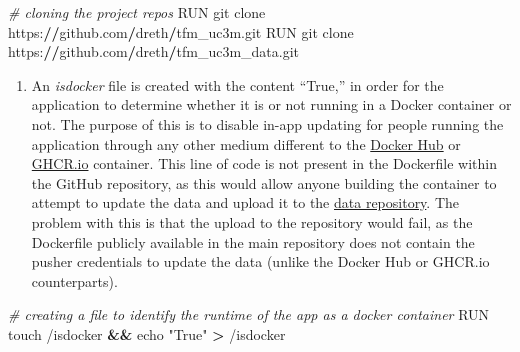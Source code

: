 \documentclass[
  a4paper]{article}
\newenvironment{Shaded}{\begin{snugshade}}{\end{snugshade}}
\newcommand{\CommentTok}[1]{\textcolor[rgb]{0.56,0.35,0.01}{\textit{#1}}}
\newcommand{\NormalTok}[1]{#1}
\newcommand{\OperatorTok}[1]{\textcolor[rgb]{0.81,0.36,0.00}{\textbf{#1}}}
\newcommand{\StringTok}[1]{\textcolor[rgb]{0.31,0.60,0.02}{#1}}
\providecommand{\tightlist}{%
  \setlength{\itemsep}{0pt}\setlength{\parskip}{0pt}}
\begin{document}
\footnotesize

\begin{Shaded}
\begin{Highlighting}[]
\CommentTok{\# cloning the project repos}
\NormalTok{RUN git clone https:}\OperatorTok{//}\NormalTok{github.com}\OperatorTok{/}\NormalTok{dreth}\OperatorTok{/}\NormalTok{tfm\_uc3m.git}
\NormalTok{RUN git clone https:}\OperatorTok{//}\NormalTok{github.com}\OperatorTok{/}\NormalTok{dreth}\OperatorTok{/}\NormalTok{tfm\_uc3m\_data.git}
\end{Highlighting}
\end{Shaded}

\normalsize

\begin{enumerate}
\def\labelenumi{\arabic{enumi}.}
\setcounter{enumi}{4}
\tightlist
\item
  An \emph{isdocker} file is created with the content ``True,'' in order
  for the application to determine whether it is or not running in a
  Docker container or not. The purpose of this is to disable in-app
  updating for people running the application through any other medium
  different to the \href{https://hub.docker.com/r/dreth/tfm_uc3m}{Docker
  Hub} or
  \href{https://github.com/dreth/tfm_uc3m/pkgs/container/tfm_uc3m}{GHCR.io}
  container. This line of code is not present in the Dockerfile within
  the GitHub repository, as this would allow anyone building the
  container to attempt to update the data and upload it to the
  \href{https://github.com/dreth/tfm_uc3m_data}{data repository}. The
  problem with this is that the upload to the repository would fail, as
  the Dockerfile publicly available in the main repository does not
  contain the pusher credentials to update the data (unlike the Docker
  Hub or GHCR.io counterparts).
\end{enumerate}

\footnotesize

\begin{Shaded}
\begin{Highlighting}[]
\CommentTok{\# creating a file to identify the runtime of the app as a docker container}
\NormalTok{RUN touch }\StringTok{\textquotesingle{}/isdocker\textquotesingle{}} \OperatorTok{\&\&}\NormalTok{ echo }\StringTok{"True"} \OperatorTok{\textgreater{}} \StringTok{\textquotesingle{}/isdocker\textquotesingle{}}
\end{Highlighting}
\end{Shaded}

\normalsize
\end{document}
